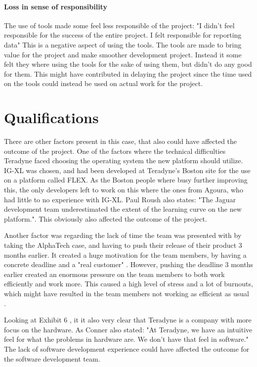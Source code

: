 \paragraph{Loss in sense of responsibility} The use of tools made some feel less responsible of the project: "I didn't feel responsible for the success of the entire project. I felt responsible for reporting data" \cite[p. 12]{GinoPisano2005}
This is a negative aspect of using the tools. The tools are made to bring value for the project and make smoother development project. Instead it some felt they where using the tools for the sake of using them, but didn't do any good for them. This might have contributed in delaying the project since the time used on the tools could instead be used on actual work for the project.

\section{Qualifications}

There are other factors present in this case, that also could have affected the outcome of the project.
One of the factors where the technical difficulties Teradyne faced choosing the operating system the new platform should utilize. IG-XL was chosen, and had been developed at Teradyne's Boston site for the use on a platform called FLEX. As the Boston people where busy further improving this, the only developers left to work on this where the ones from Agoura, who had little to no experience with IG-XL. Paul Roush also states: "The Jaguar development team underestimated the extent of the learning curve on the new platform."\cite[p. 9]{GinoPisano2005}. This obviously also affected the outcome of the project.

Another factor was regarding the lack of time the team was presented with by taking the AlphaTech case, and having to push their release of their product 3 months earlier. It created a huge motivation for the team members, by having a concrete deadline and a "real customer" \cite[p. 10]{GinoPisano2005}. However, pushing the deadline 3 months earlier created an enormous pressure on the team members to both work efficiently and work more. This caused a high level of stress and a lot of burnouts, which might have resulted in the team members not working as efficient as usual \cite[p. 10]{GinoPisano2005}. 

Looking at Exhibit 6 \cite[p. 20]{GinoPisano2005}, it it also very clear that Teradyne is a company with more focus on the hardware. As Conner also stated: "At Teradyne, we have an intuitive feel for what the problems in hardware are. We don't have that feel in software."\cite[p. 10]{GinoPisano2005} The lack of software development experience could have affected the outcome for the software development team. 
